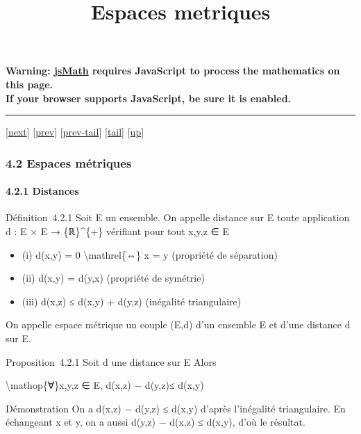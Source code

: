 \documentclass[]{article}
\title{Espaces metriques}
\author{}
\date{}
\begin{document}
\maketitle

\textbf{Warning: \href{http://www.math.union.edu/locate/jsMath}{jsMath}
requires JavaScript to process the mathematics on this page.\\ If your
browser supports JavaScript, be sure it is enabled.}

\begin{center}\rule{3in}{0.4pt}\end{center}

{[}\href{coursse20.html}{next}{]} {[}\href{coursse18.html}{prev}{]}
{[}\href{coursse18.html\#tailcoursse18.html}{prev-tail}{]}
{[}\hyperref[tailcoursse19.html]{tail}{]}
{[}\href{coursch5.html\#coursse19.html}{up}{]}

\subsubsection{4.2 Espaces métriques}

\paragraph{4.2.1 Distances}

Définition~4.2.1 Soit E un ensemble. On appelle distance sur E toute
application d : E × E → \{ℝ\}\^{}\{+\} vérifiant pour tout x,y,z ∈ E

\begin{itemize}
\itemsep1pt\parskip0pt
\item
  (i) d(x,y) = 0 \textbackslash{}mathrel\{⇔\} x = y (propriété de
  séparation)
\item
  (ii) d(x,y) = d(y,x) (propriété de symétrie)
\item
  (iii) d(x,z) ≤ d(x,y) + d(y,z) (inégalité triangulaire)
\end{itemize}

On appelle espace métrique un couple (E,d) d'un ensemble E et d'une
distance d sur E.

Proposition~4.2.1 Soit d une distance sur E Alors

\textbackslash{}mathop\{∀\}x,y,z ∈ E, \textbar{}d(x,z) −
d(y,z)\textbar{}≤ d(x,y)

Démonstration On a d(x,z) − d(y,z) ≤ d(x,y) d'après l'inégalité
triangulaire. En échangeant x et y, on a aussi d(y,z) − d(x,z) ≤ d(x,y),
d'où le résultat.
\end{document}
